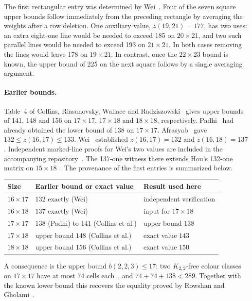 \documentclass[11pt]{article}
\begin{document}
The first rectangular entry was determined by Wei~\cite{wei}. Four of the
seven square upper bounds follow immediately from the preceding rectangle
by averaging the weights after a row deletion.
One auxiliary value, $z(19,21)=177$, has two uses: an extra eight-one line
would be needed to exceed 185 on $20\times21$, and two such parallel lines
would be needed to exceed 193 on $21\times21$. In both cases removing the
lines would leave 178 on $19\times21$. In contrast, once the $22\times23$
bound is known, the upper bound of 225 on the next square follows by a
single averaging argument.

\paragraph{Earlier bounds.}
Table~4 of Collins, Riasanovsky, Wallace and Radziszowski~\cite{crwr}
gives upper bounds of 141, 148 and 156 on $17\times17$, $17\times18$ and
$18\times18$, respectively. Padhi~\cite{padhi} had already obtained the
lower bound of 138 on $17\times17$. Afrasyab~\cite{afra} gave
$132\le z(16,17)\le133$. Wei~\cite{wei} established $z(16,17)=132$ and
$z(16,18)=137$. Independent marked-line proofs for Wei's two values are
included in the accompanying repository~\cite{code}. The 137-one
witness there extends Hou's 132-one matrix on $15\times18$~\cite{hou}.
The provenance of the first entries is summarized below.
\begin{center}\small
\begin{tabular}{@{}lll@{}}
\toprule
Size & Earlier bound or exact value & Result used here\\
\midrule
$16\times17$ & $132$ exactly (Wei) & independent verification\\
$16\times18$ & $137$ exactly (Wei) & input for $17\times18$\\
$17\times17$ & $138$ (Padhi) to $141$ (Collins et al.) & upper bound $138$\\
$17\times18$ & upper bound $148$ (Collins et al.) & exact value $143$\\
$18\times18$ & upper bound $156$ (Collins et al.) & exact value $150$\\
\bottomrule
\end{tabular}
\end{center}

A consequence is the upper bound $b(2,2,3)\le17$: two $K_{2,2}$-free
colour classes on $17\times17$ have at most 74 cells each~\cite{crwr},
and $74+74+138<289$. Together with the known lower bound this recovers
the equality proved by Rowshan and Gholami~\cite{rg}.
\end{document}
